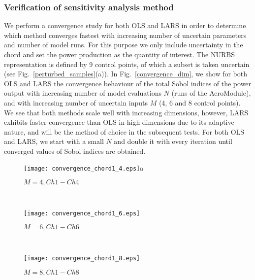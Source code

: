 \subsubsection{Verification of sensitivity analysis method}
We perform a convergence study for both OLS and LARS in order to determine which method converges fastest with increasing number of uncertain parameters and number of model runs. For this purpose we only include uncertainty in the chord and set the power production as the quantity of interest. The NURBS representation is defined by 9 control points, of which a subset is taken uncertain (see Fig.\ \ref{perturbed_samples}(a)). In Fig.\ \ref{convergence_dim}, we show for both OLS and LARS the convergence behaviour of the total Sobol indices of the power output with increasing number of model evaluations $N$ (runs of the AeroModule), and with increasing number of uncertain inputs $M$ (4, 6 and 8 control points). We see that both methods scale well with increasing dimensions, however, LARS exhibits faster convergence than OLS in high dimensions due to its adaptive nature, and will be the method of choice in the subsequent tests. For both OLS and LARS, we start with a small $N$ and double it with every iteration until converged values of Sobol indices are obtained.

\begin{figure*}[h!]
    \centering
    \begin{subfigure}[t]{0.32\textwidth}
        \centering
        \texttt{[image: convergence\_chord1\_4.eps]}{a}
        \caption{$M=4, Ch1-Ch4$}
    \end{subfigure}%
    ~ 
    \begin{subfigure}[t]{0.32\textwidth}
        \centering
        \texttt{[image: convergence\_chord1\_6.eps]}
        \caption{$M=6, Ch1-Ch6$}
    \end{subfigure}
      ~ 
    \begin{subfigure}[t]{0.32\textwidth}
        \centering
        \texttt{[image: convergence\_chord1\_8.eps]}
        \caption{ $M=8, Ch1-Ch8$}
 \end{subfigure}
    \caption{Convergence of OLS and LARS with increasing number of uncertain inputs $M$ and model evaluations $N$.}
\label{convergence_dim}
\end{figure*}

